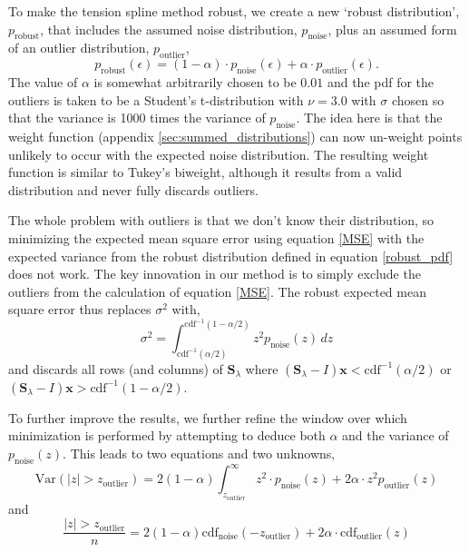 \documentclass[10pt,journal]{IEEEtran}
\begin{document}
To make the tension spline method robust, we create a new `robust distribution', $p_{\textrm{robust}}$, that includes the assumed noise distribution, $p_{\textrm{noise}}$, plus an assumed form of an outlier distribution, $p_{\textrm{outlier}}$,
\begin{equation}
\label{robust_pdf}
    p_{\textrm{robust}}(\epsilon) = (1-\alpha) \cdot p_{\textrm{noise}}(\epsilon) + \alpha \cdot  p_{\textrm{outlier}}(\epsilon).
\end{equation}
The value of $\alpha$ is somewhat arbitrarily chosen to be $0.01$ and the pdf for the outliers is taken to be a Student's t-distribution with $\nu=3.0$ with $\sigma$ chosen so that the variance is 1000 times the variance of $p_{\textrm{noise}}$. The idea here is that the weight function (appendix \ref{sec:summed_distributions}) can now un-weight points unlikely to occur with the expected noise distribution. The resulting weight function is similar to Tukey's biweight, although it results from a valid distribution and never fully discards outliers.

The whole problem with outliers is that we don't know their distribution, so minimizing the expected mean square error using equation \ref{MSE} with the expected variance from the robust distribution defined in equation \ref{robust_pdf} does not work. The key innovation in our method is to simply exclude the outliers from the calculation of equation \ref{MSE}. The robust expected mean square error thus replaces $\sigma^2$ with,
\begin{equation}
    \sigma^2 = \int_{\textrm{cdf}^{-1}(\alpha/2)}^{\textrm{cdf}^{-1}(1-\alpha/2)} z^2 p_{\textrm{noise}}(z) \, dz
\end{equation}
and discards all rows (and columns) of $\mathbf{S}_\lambda$ where $\left(\mathbf{S}_\lambda - I\right)\mathbf{x}<\textrm{cdf}^{-1}(\alpha/2)$ or $\left(\mathbf{S}_\lambda - I\right)\mathbf{x}>\textrm{cdf}^{-1}(1-\alpha/2)$.

To further improve the results, we further refine the window over which minimization is performed by attempting to deduce both $\alpha$ and the variance of $p_{\textrm{noise}}(z)$. This leads to two equations and two unknowns,
\begin{equation}
    \textrm{Var}(|z|>z_\textrm{outlier}) = 2 (1-\alpha)  \int_{z_\textrm{outlier}}^{\infty}  z^2 \cdot p_{\textrm{noise}}(z) + 2 \alpha \cdot  z^2 p_{\textrm{outlier}}(z)
\end{equation}
and
\begin{equation}
    \frac{|z|>z_\textrm{outlier}}{n} = 2 (1-\alpha) \textrm{cdf}_{\textrm{noise}}(-z_\textrm{outlier}) + 2 \alpha \cdot  \textrm{cdf}_{\textrm{outlier}}(z)
\end{equation}
\end{document}
